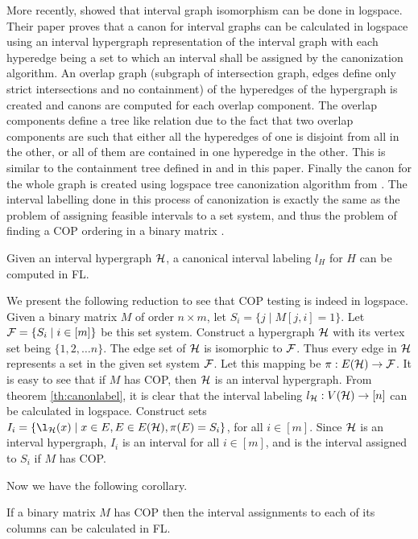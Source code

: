 \documentclass{llncs}
\def\cF{{\cal F}}
\def\cH{{\cal H}}
\begin{document}
\noindent
More recently, \cite{kklv10} showed that interval graph isomorphism
can be done in logspace. Their paper proves that a canon for interval
graphs can be calculated in logspace using an interval hypergraph
representation of the interval graph with each hyperedge being a set
to which an interval shall be assigned by the canonization
algorithm. An overlap graph (subgraph of intersection graph, edges
define only strict intersections and no containment) of the hyperedges
of the hypergraph is created and canons are computed for each overlap
component. The overlap components define a tree like relation due to
the fact that two overlap components are such that either all the
hyperedges of one is disjoint from all in the other, or all of them
are contained in one hyperedge in the other. This is similar to the
containment tree defined in \cite{nsnrs09} and in this paper. Finally
the canon for the whole graph is created using logspace tree
canonization algorithm from \cite{sl92}. The interval labelling done
in this process of canonization is exactly the same as the problem of
assigning feasible intervals to a set system, and thus the problem of
finding a COP ordering in a binary matrix \cite{nsnrs09}.

\begin{theorem} 
\label{th:canonlabel}
Given an interval hypergraph $\cH$, a canonical interval labeling $l_H$ 
for $H$ can be computed in FL.
\end{theorem}


We present the following reduction to see that COP testing is
indeed in logspace. Given a binary matrix $M$ of order $n \times m$,
let $S_i = \{j \mid M[j,i]=1 \}$. Let $\cF = \{S_i \mid i \in [m] \}$
be this set system. Construct a hypergraph $\cH$ with its vertex set
being $\{1, 2, \dots n\}$. The edge set of $\cH$ is isomorphic to
$\cF$. Thus every edge in $\cH$ represents a set in the given set
system $\cF$. Let this mapping be $\pi: E(\cH) \rightarrow \cF$. It is
easy to see that if $M$ has COP, then $\cH$ is an interval
hypergraph. From theorem \ref{th:canonlabel}, it is clear that the
interval labeling $l_{\cH}: V(\cH) \rightarrow [n]$ can be calculated
in logspace. Construct sets $I_i = \{ \l_{\cH}(x) \mid x \in E, E \in
E(\cH), \pi(E) = S_i\}$, for all $i \in [m]$. Since $\cH$ is an
interval hypergraph, $I_i$ is an interval for all $i \in [m]$, and is
the interval assigned to $S_i$ if $M$ has COP.

Now we have the following corollary.
\begin{corollary}
\label{cor:coplog}
  If a binary matrix $M$ has COP then the interval assignments to each
  of its columns can be calculated in FL.
\end{corollary}
\end{document}
